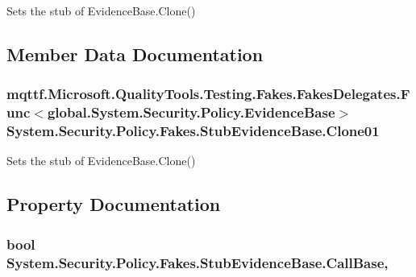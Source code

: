 Sets the stub of Evidence\-Base.\-Clone()



\subsection{Member Data Documentation}
\hypertarget{class_system_1_1_security_1_1_policy_1_1_fakes_1_1_stub_evidence_base_a0bfe23691713eb5e76740e07ae8aef64}{
\subsubsection[{Clone01}]{\setlength{\rightskip}{0pt plus 5cm}mqttf.\-Microsoft.\-Quality\-Tools.\-Testing.\-Fakes.\-Fakes\-Delegates.\-Func$<$global.\-System.\-Security.\-Policy.\-Evidence\-Base$>$ System.\-Security.\-Policy.\-Fakes.\-Stub\-Evidence\-Base.\-Clone01}}\label{class_system_1_1_security_1_1_policy_1_1_fakes_1_1_stub_evidence_base_a0bfe23691713eb5e76740e07ae8aef64}


Sets the stub of Evidence\-Base.\-Clone()



\subsection{Property Documentation}
\hypertarget{class_system_1_1_security_1_1_policy_1_1_fakes_1_1_stub_evidence_base_a32670a0e8868bc3ef62131763e61c620}{
\subsubsection[{Call\-Base}]{\setlength{\rightskip}{0pt plus 5cm}bool System.\-Security.\-Policy.\-Fakes.\-Stub\-Evidence\-Base.\-Call\-Base\hspace{0.3cm}{\ttfamily [get]}, {\ttfamily [set]}}}\label{class_system_1_1_security_1_1_policy_1_1_fakes_1_1_stub_evidence_base_a32670a0e8868bc3ef62131763e61c620}


